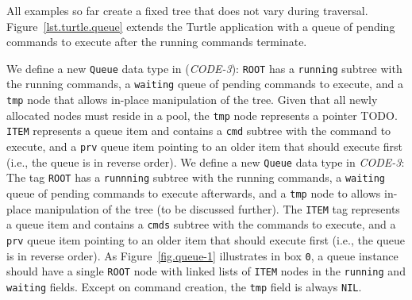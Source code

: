\documentclass{sig-alternate}
\newcommand{\code}[1] {{\small{\texttt{#1}}}}
\begin{document}
All examples so far create a fixed tree that does not vary during traversal.
%
Figure~\ref{lst.turtle.queue} extends the Turtle application with a queue of 
pending commands to execute after the running commands terminate.

We define a new \code{Queue} data type in (\emph{CODE-3}):
\code{ROOT} has a \code{running} subtree with the running commands, a 
\code{waiting} queue of pending commands to execute, and a \code{tmp} node that 
allows in-place manipulation of the tree.
Given that all newly allocated nodes must reside in a pool, the \code{tmp} node 
represents a pointer TODO.
\code{ITEM} represents a queue item and contains a \code{cmd} subtree with the 
command to execute, and a \code{prv} queue item pointing to an older item that 
should execute first (i.e., the queue is in reverse order).
%
We define a new \code{Queue} data type in \emph{CODE-3}:
The tag \code{ROOT} has a \code{runnning} subtree with the running commands, a 
\code{waiting} queue of pending commands to execute afterwards, and a 
\code{tmp} node to allows in-place manipulation of the tree (to be discussed 
further).
%
The \code{ITEM} tag represents a queue item and contains a \code{cmds} subtree 
with the commands to execute, and a \code{prv} queue item pointing to an older 
item that should execute first (i.e., the queue is in reverse order).
%
As Figure~\ref{fig.queue-1} illustrates in box \code{0}, a queue instance 
should have a single \code{ROOT} node with linked lists of \code{ITEM} nodes in 
the \code{running} and \code{waiting} fields.
Except on command creation, the \code{tmp} field is always \code{NIL}.
\end{document}
